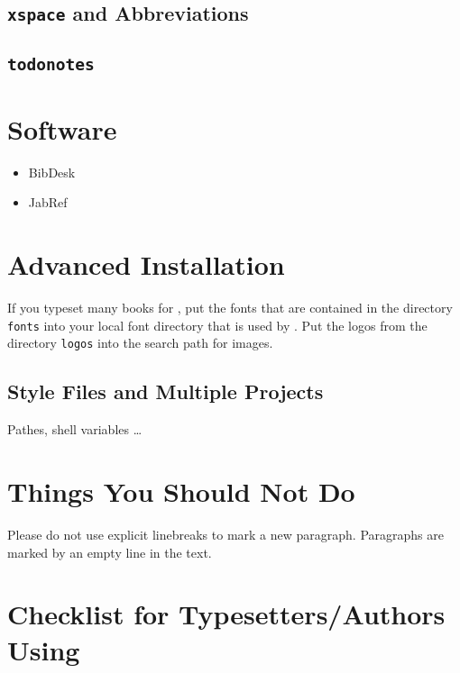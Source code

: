 \subsection{\texttt{xspace} and Abbreviations}

\subsection{\texttt{todonotes}}

\section{Software}

\begin{itemize}
\item BibDesk
\item JabRef
\end{itemize}


\section{Advanced Installation}
\label{sec-advanced-latex-installation}

If you typeset many books for \lsp, put the fonts that are contained in the directory \texttt{fonts}
into your local font directory that is used by \xelatex. Put the logos from the directory \texttt{logos} into the
search path for images. 


\subsection{Style Files and Multiple Projects}

Pathes, shell variables \ldots

\section{Things You Should Not Do}

Please do not use explicit linebreaks to mark a new paragraph. Paragraphs are marked by an empty
line in the text.

\section{Checklist for Typesetters/Authors Using \latex}
\label{sec-check-typesetters}


